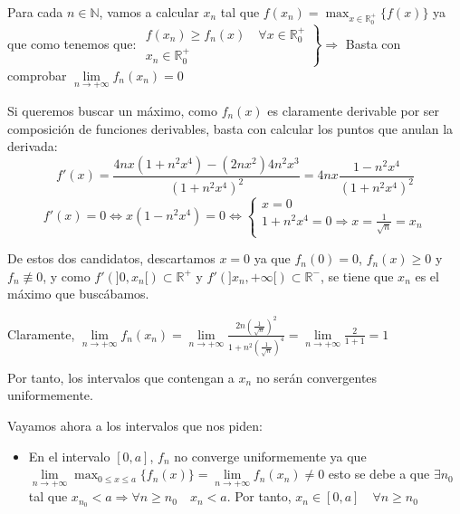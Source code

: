 \documentclass[a4paper, 11pt]{article} %
\begin{document}
\begin{enumerate}
  		Para cada $n \in \mathbb{N}$, vamos a calcular $x_n$ tal que $\displaystyle{f(x_n) =
  		\max_{x \in	\mathbb{R}^+_0}\{f(x)\}}$ ya que como tenemos que:
  		$ \left. \begin{array}{c}
  			f(x_n) \geq f_n(x) \quad \forall x \in \mathbb{R}^+_0\\
  			x_n \in \mathbb{R}^+_0
   		\end{array} \right\}
   		\Rightarrow$ Basta con comprobar $\lim\limits_{n \rightarrow +\infty} f_n(x_n) = 0$
   		
   		Si queremos buscar un máximo, como $f_n(x)$ es claramente derivable por ser composición
   		de funciones derivables, basta con calcular los puntos que anulan la derivada:
   		$$f'(x) = \frac{4nx(1+n^2x^4)-(2nx^2)4n^2x^3}{(1 + n^2x^4)^2} = 4nx \frac{1-n^2x^4}{(1+n^2x^4)^2}$$
   		$$f'(x) = 0 \Leftrightarrow x(1-n^2x^4) = 0 \Leftrightarrow
   		\left\{\begin{array}{c}
  			x = 0\\
   		  	1 + n^2x^4 = 0 \Rightarrow \displaystyle{x = \frac{1}{\sqrt{n}} = x_n}
   		\end{array}\right.$$
  		
  		De estos dos candidatos, descartamos $x = 0$ ya que $f_n(0) = 0$, $f_n(x) \geq 0$ y
  		$f_n \not \equiv 0$, y como $f'(]0,x_n[) \subset \mathbb{R}^+$ y $f'(]x_n, + \infty[)
  		\subset \mathbb{R}^-$, se tiene que $x_n$ es el máximo que buscábamos.
  		
  		Claramente, $\lim\limits_{n \rightarrow +\infty} f_n(x_n) = \lim\limits_{n \rightarrow +\infty} 
  		\frac{\displaystyle{2n\left(\frac{1}{\sqrt{n}}\right)^2}}{\displaystyle{1+n^2\left(\frac{1}{\sqrt{n}}\right)^4}}
  		= \lim\limits_{n \rightarrow +\infty} \displaystyle{\frac{2}{1+1}} = 1$
  		
  		Por tanto, los intervalos que contengan a $x_n$ no serán convergentes uniformemente.
  		
  		Vayamos ahora a los intervalos que nos piden:
  		\begin{itemize}
  			\item En el intervalo $[0,a]$, $f_n$ no converge uniformemente ya que \\
  			$\displaystyle{\lim\limits_{n \rightarrow +\infty} \max_{0 \leq x \leq a}\{f_n(x)\}
  			= \lim\limits_{n \rightarrow +\infty} f_n(x_n)} \neq 0$ esto se debe a que $\exists
  			n_0$ tal que $x_{n_0} < a \Rightarrow \forall n \geq n_0 \quad x_n < a$.
  			Por tanto, $x_n \in [0,a] \quad \forall n \geq n_0$
  			

\end{itemize}
\end{enumerate}
\end{document}

